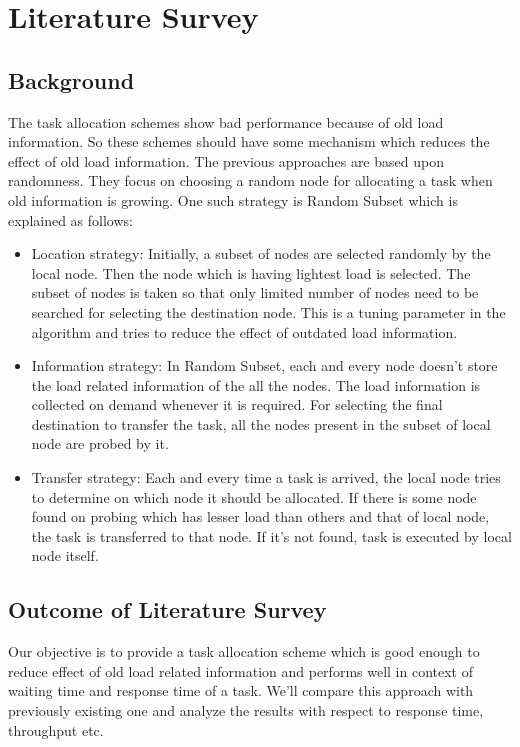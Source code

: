 \documentclass[12pt]{article}
\begin{document}
 
\clearpage
\section{Literature Survey}
\subsection{Background }
The task allocation schemes show bad performance because of old load information. So these schemes should have some mechanism which reduces the effect of old load information. The previous approaches are based upon randomness. They focus on choosing a random node for allocating a task when old information is growing. One such strategy is Random Subset which is explained as follows:

\begin{itemize}
  \item Location strategy: Initially, a subset of nodes are selected randomly by the local node. Then the node which is having lightest load is selected. The subset of nodes is taken so that only limited number of nodes need to be searched for selecting the destination node. This is a tuning parameter in the algorithm and tries to reduce the effect of outdated load information.
  \item Information strategy: In Random Subset, each and every node doesn’t store the load related information of the all the nodes. The load information is collected on demand whenever it is required. For selecting the final destination to transfer the task, all the nodes present in the subset of local node are probed by it.
  \item Transfer strategy: Each and every time a task is arrived, the local node tries to determine on which node it should be allocated. If there is some node found on probing which has lesser load than others and that of local node, the task is transferred to that node. If it’s not found, task is executed by local node itself.
\end{itemize}


\subsection{Outcome of Literature Survey}
Our objective is to provide a task allocation scheme which is good enough to reduce effect of old load related information and performs well in context of waiting time and response time of a task. We’ll compare this approach with previously existing one and analyze the results with respect to response time, throughput etc.
\end{document}
